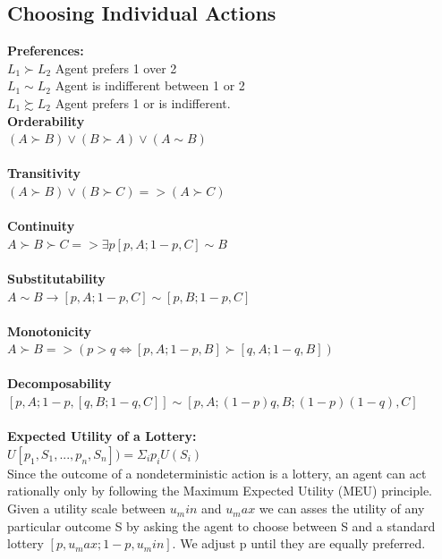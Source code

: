 \documentclass{article}
\begin{document}
\subsection{Choosing Individual Actions}
\textbf{Preferences:}\\
$L_1 \succ L_2$ Agent prefers 1 over 2\\
$L_1 \sim L_2$ Agent is indifferent between 1 or 2\\
$L_1 \succsim L_2$ Agent prefers 1 or is indifferent.\\
\textbf{Orderability}\\
$(A \succ B) \lor (B \succ A)\lor(A \sim B)$\\\\
\textbf{Transitivity}\\
$(A\succ B)\lor(B\succ C) => (A \succ C)$\\\\
\textbf{Continuity}\\
$A\succ B \succ C => \exists p[p,A;1-p,C]\sim B$\\\\
\textbf{Substitutability}\\
$A\sim B \rightarrow [p,A;1-p,C]\sim [p,B;1-p,C]$\\\\
\textbf{Monotonicity}\\
$A\succ B=>(p > q \Leftrightarrow [p,A;1-p,B]\succ [q,A;1-q,B])$\\\\
\textbf{Decomposability}\\
$[p,A;1-p,[q,B;1-q,C]] \sim [p,A;(1-p)q,B;(1-p)(1-q),C]$\\\\
\textbf{Expected Utility of a Lottery:}\\
$U[p_1,S_1,...,p_n,S_n]) = \Sigma_i p_i U(S_i)$\\
Since the outcome of a nondeterministic action is a lottery, an agent can act rationally only by following the Maximum Expected Utility (MEU) principle.\\
Given a utility scale between $u_min$ and $u_max$ we can asses the utility of any
particular outcome S by asking the agent to choose between S and a standard lottery $[p,u_max;1-p,u_min]$. We adjust p until they are equally preferred.
\end{document}
